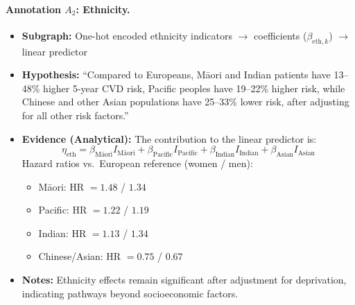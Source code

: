 \documentclass{article}
\begin{document}
\paragraph{Annotation $A_2$: Ethnicity.}
\begin{itemize}
    \item \textbf{Subgraph:} One-hot encoded ethnicity indicators $\rightarrow$ coefficients ($\beta_{\text{eth},k}$) $\rightarrow$ linear predictor
    \item \textbf{Hypothesis:} ``Compared to Europeans, M\=aori and Indian patients have 13--48\% higher 5-year CVD risk, Pacific peoples have 19--22\% higher risk, while Chinese and other Asian populations have 25--33\% lower risk, after adjusting for all other risk factors.''
    \item \textbf{Evidence (Analytical):} The contribution to the linear predictor is:
    \[
    \eta_{\text{eth}} = \beta_{\text{M\={a}ori}} I_{\text{M\={a}ori}} + \beta_{\text{Pacific}} I_{\text{Pacific}} + \beta_{\text{Indian}} I_{\text{Indian}} + \beta_{\text{Asian}} I_{\text{Asian}}
    \]
    Hazard ratios vs.\ European reference (women / men):
    \begin{itemize}
        \item M\=aori: HR $= 1.48$ / $1.34$
        \item Pacific: HR $= 1.22$ / $1.19$
        \item Indian: HR $= 1.13$ / $1.34$
        \item Chinese/Asian: HR $= 0.75$ / $0.67$
    \end{itemize}
    \item \textbf{Notes:} Ethnicity effects remain significant after adjustment for deprivation, indicating pathways beyond socioeconomic factors.
\end{itemize}
\end{document}
